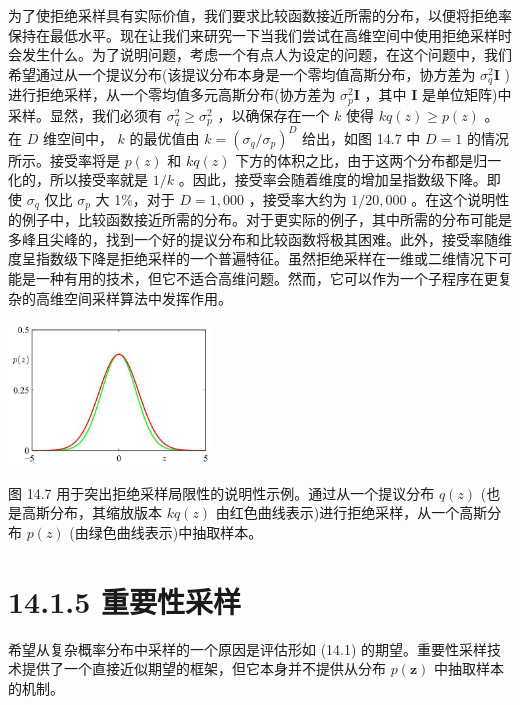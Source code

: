 \documentclass[10pt]{report}
\begin{document}
为了使拒绝采样具有实际价值，我们要求比较函数接近所需的分布，以便将拒绝率保持在最低水平。现在让我们来研究一下当我们尝试在高维空间中使用拒绝采样时会发生什么。为了说明问题，考虑一个有点人为设定的问题，在这个问题中，我们希望通过从一个提议分布(该提议分布本身是一个零均值高斯分布，协方差为 \({\sigma }_{q}^{2}\mathbf{I}\) )进行拒绝采样，从一个零均值多元高斯分布(协方差为 \({\sigma }_{p}^{2}\mathbf{I}\) ，其中 \(\mathbf{I}\) 是单位矩阵)中采样。显然，我们必须有 \({\sigma }_{q}^{2} \geq  {\sigma }_{p}^{2}\) ，以确保存在一个 \(k\) 使得 \({kq}\left( z\right)  \geq  p\left( z\right)\) 。在 \(D\) 维空间中， \(k\) 的最优值由 \(k = {\left( {\sigma }_{q}/{\sigma }_{p}\right) }^{D}\) 给出，如图 14.7 中 \(D = 1\) 的情况所示。接受率将是 \(p\left( z\right)\) 和 \({kq}\left( z\right)\) 下方的体积之比，由于这两个分布都是归一化的，所以接受率就是 \(1/k\) 。因此，接受率会随着维度的增加呈指数级下降。即使 \({\sigma }_{q}\) 仅比 \({\sigma }_{p}\) 大 1\%，对于 \(D = 1,{000}\) ，接受率大约为 \(1/{20},{000}\) 。在这个说明性的例子中，比较函数接近所需的分布。对于更实际的例子，其中所需的分布可能是多峰且尖峰的，找到一个好的提议分布和比较函数将极其困难。此外，接受率随维度呈指数级下降是拒绝采样的一个普遍特征。虽然拒绝采样在一维或二维情况下可能是一种有用的技术，但它不适合高维问题。然而，它可以作为一个子程序在更复杂的高维空间采样算法中发挥作用。

\begin{center}
\includegraphics[max width=0.4\textwidth]{images/0194e279-9b28-703a-88f4-c3ac21e2010d_455_921_1510_613_435_0.jpg}
\end{center}
\hspace*{3em} 

图 14.7 用于突出拒绝采样局限性的说明性示例。通过从一个提议分布 \(q\left( z\right)\) (也是高斯分布，其缩放版本 \({kq}\left( z\right)\) 由红色曲线表示)进行拒绝采样，从一个高斯分布 \(p\left( z\right)\) (由绿色曲线表示)中抽取样本。

\section*{14.1.5 重要性采样}

希望从复杂概率分布中采样的一个原因是评估形如 (14.1) 的期望。重要性采样技术提供了一个直接近似期望的框架，但它本身并不提供从分布 \(p\left( \mathbf{z}\right)\) 中抽取样本的机制。
\end{document}
